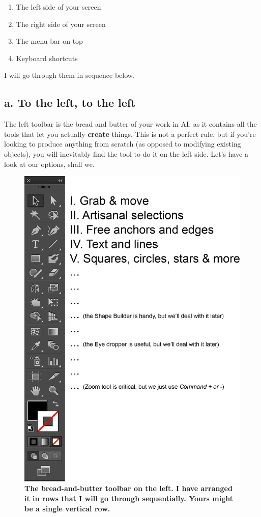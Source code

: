 \documentclass[]{article}
\begin{document}
\begin{enumerate}
\def\labelenumi{\alph{enumi}.}
\item
  The left side of your screen
\item
  The right side of your screen
\item
  The menu bar on top
\item
  Keyboard shortcuts
\end{enumerate}

I will go through them in sequence below.

\subsection{a. To the left, to the
left}\label{a.-to-the-left-to-the-left}

The left toolbar is the bread and butter of your work in AI, as it
contains all the tools that let you actually \textbf{create} things.
This is not a perfect rule, but if you're looking to produce anything
from scratch (as opposed to modifying existing objects), you will
inevitably find the tool to do it on the left side. Let's have a look at
our options, shall we.

\begin{figure}
\centering
\includegraphics{LeftToolbar.png}
\caption{\textbf{The bread-and-butter toolbar on the left. I have
arranged it in rows that I will go through sequentially. Yours might be
a single vertical row.}}
\end{figure}
\end{document}
